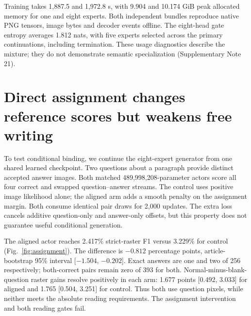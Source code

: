 \documentclass[12pt,a4paper]{article}
\begin{document}
Training takes 1,887.5 and 1,972.8 s, with 9.904 and 10.174 GiB peak allocated
memory for one and eight experts. Both independent bundles reproduce native
PNG tensors, image bytes and decoder events offline. The eight-head gate
entropy averages 1.812 nats, with five experts selected across the primary
continuations, including termination. These usage diagnostics describe the
mixture; they do not demonstrate semantic specialization (Supplementary
Note 21).


\section*{Direct assignment changes reference scores but weakens free writing}
To test conditional binding, we continue the eight-expert generator from one
shared learned checkpoint. Two questions about a paragraph provide distinct
accepted answer images. Both matched 489,998,208-parameter actors score all
four correct and swapped question--answer streams. The control uses positive
image likelihood alone; the aligned arm adds a smooth penalty on the
assignment margin. Both consume identical pair draws for 2,000 updates.
The extra loss cancels additive question-only and answer-only offsets, but
this property does not guarantee useful conditional generation.

The aligned actor reaches 2.417\% strict-raster F1 versus 3.229\% for control
(Fig.~\ref{fig:assignment}). The difference is $-0.812$ percentage points,
article-bootstrap 95\% interval [$-1.504$, $-0.202$]. Exact answers are one
and two of 256 respectively; both-correct pairs remain zero of 393 for both.
Normal-minus-blank-question raster gains resolve positively in each arm:
1.677 points [0.492, 3.033] for aligned and 1.765 [0.504, 3.251] for control.
Thus both use question pixels, while neither meets the absolute reading
requirements. The assignment intervention and both reading gates fail.
\end{document}
